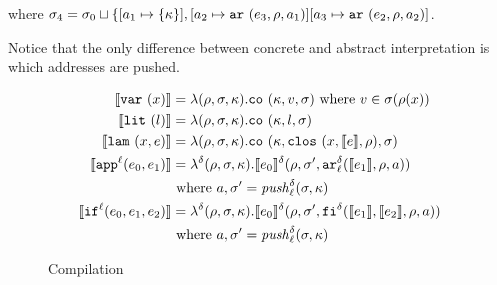 \documentclass[preprint,onecolumn,9pt]{sigplanconf} %
\begin{document}
where $\msto_4 = \msto_0 \sqcup \{ [\maddr_1 \mapsto \{ \mkont \}],
[\maddr_2 \mapsto \kar{\mexp_3,\menv,\maddr_1}]
[\maddr_3 \mapsto \kar{\mexp_2,\menv,\maddr_2}]$.


Notice that the only difference between concrete and abstract interpretation
is which addresses are pushed.

\begin{figure}
\begin{align*}
\compile{\svar\mvar} &= \lambda(\menv,\msto,\mkont) .\co{\mkont,\mval,\msto} \text{ where }\mval\in\msto(\menv(\mvar))
\\
\compile{\slit\mlit} &= \lambda(\menv,\msto,\mkont) .
\co{\mkont,\mlit,\msto}
\\
\compile{\slam\mvar\mexp} &= \lambda(\menv,\msto,\mkont) .
\co{\mkont,\clos{\mvar,\compile\mexp,\menv},\msto}
\\
\compile{\sapp[^\mlab]{\mexpi0}{\mexpi1}} &= \lambda^\mcntr(\menv,\msto,\mkont) .
\compile{\mexpi0}^\mcntr(\menv,\msto',\kar[_\mlab^\mcntr]{\compile{\mexpi1},\menv,\maddr})
\\
&
\text{ where }\maddr,\msto' = \mathit{push}^\mcntr_\mlab(\msto,\mkont)
\\
\compile{\sif[^\mlab]{\mexpi0}{\mexpi1}{\mexpi2}} &= \lambda^\mcntr(\menv,\msto,\mkont) .
\compile{\mexpi0}^\delta(\menv,\msto',\kif[^\mcntr]{\compile{\mexpi1},\compile{\mexpi2},\menv,\maddr})
\\
&\text{ where }\maddr,\msto' = \mathit{push}_\mlab^\mcntr(\msto,\mkont)
\end{align*}
\caption{Compilation}
\end{figure}
\end{document}

